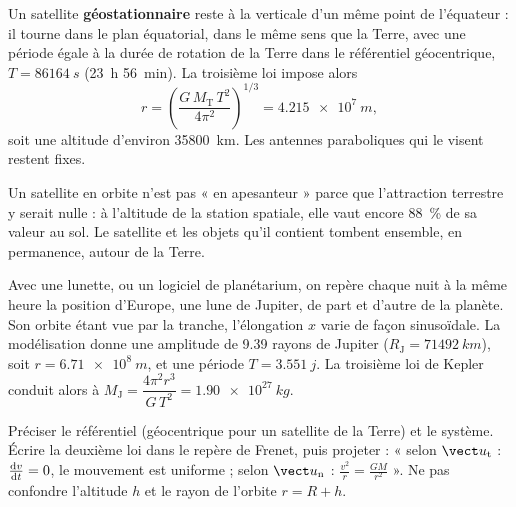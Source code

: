 \begin{propriete}
Un satellite \textbf{géostationnaire} reste à la verticale d'un même point de l'équateur : il tourne dans le plan
équatorial, dans le même sens que la Terre, avec une période égale à la durée de rotation de la Terre dans le
référentiel géocentrique, $T=\qty{86164}{s}$ (23~h 56~min). La troisième loi impose alors
\[r=\left(\frac{G\,M_\mathrm{T}\,T^2}{4\pi^2}\right)^{1/3}=\qty{4,215e7}{m},\]
soit une altitude d'environ \num{35800}~km. Les antennes paraboliques qui le visent restent fixes.
\end{propriete}
\begin{attention}
Un satellite en orbite n'est pas « en apesanteur » parce que l'attraction terrestre y serait nulle : à l'altitude de la
station spatiale, elle vaut encore 88~\% de sa valeur au sol. Le satellite et les objets qu'il contient tombent ensemble,
en permanence, autour de la Terre.
\end{attention}
\begin{experience}
Avec une lunette, ou un logiciel de planétarium, on repère chaque nuit à la même heure la position d'Europe, une lune
de Jupiter, de part et d'autre de la planète. Son orbite étant vue par la tranche, l'élongation $x$ varie de façon
sinusoïdale. La modélisation donne une amplitude de \num{9,39} rayons de Jupiter ($R_\mathrm{J}=\qty{71492}{km}$),
soit $r=\qty{6,71e8}{m}$, et une période $T=\qty{3,551}{j}$. La troisième loi de Kepler conduit alors à
$M_\mathrm{J}=\dfrac{4\pi^2 r^3}{G\,T^2}=\qty{1,90e27}{kg}$.
\end{experience}
\begin{rediger}
Préciser le référentiel (géocentrique pour un satellite de la Terre) et le système. Écrire la deuxième loi dans le repère
de Frenet, puis projeter : « selon $\ut$ : $\frac{\mathrm{d}v}{\mathrm{d}t}=0$, le mouvement est uniforme ; selon $\un$ : $\frac{v^2}{r}=\frac{GM}{r^2}$ ». Ne
pas confondre l'altitude $h$ et le rayon de l'orbite $r=R+h$.
\end{rediger}
\exercices

